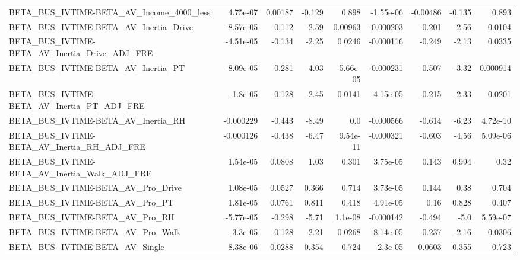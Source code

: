 \begin{tabular}{lrrrrrrrr}
BETA\_BUS\_IVTIME-BETA\_AV\_Income\_4000\_less           &    4.75e-07 &      0.00187 &   -0.129 &    0.898 &  -1.55e-06 &    -0.00486 &       -0.135 &         0.893 \\
BETA\_BUS\_IVTIME-BETA\_AV\_Inertia\_Drive              &   -8.57e-05 &       -0.112 &    -2.59 &  0.00963 &  -0.000203 &      -0.201 &        -2.56 &        0.0104 \\
BETA\_BUS\_IVTIME-BETA\_AV\_Inertia\_Drive\_ADJ\_FRE      &   -4.51e-05 &       -0.134 &    -2.25 &   0.0246 &  -0.000116 &      -0.249 &        -2.13 &        0.0335 \\
BETA\_BUS\_IVTIME-BETA\_AV\_Inertia\_PT                 &   -8.09e-05 &       -0.281 &    -4.03 & 5.66e-05 &  -0.000231 &      -0.507 &        -3.32 &      0.000914 \\
BETA\_BUS\_IVTIME-BETA\_AV\_Inertia\_PT\_ADJ\_FRE         &    -1.8e-05 &       -0.128 &    -2.45 &   0.0141 &  -4.15e-05 &      -0.215 &        -2.33 &        0.0201 \\
BETA\_BUS\_IVTIME-BETA\_AV\_Inertia\_RH                 &   -0.000229 &       -0.443 &    -8.49 &      0.0 &  -0.000566 &      -0.614 &        -6.23 &      4.72e-10 \\
BETA\_BUS\_IVTIME-BETA\_AV\_Inertia\_RH\_ADJ\_FRE         &   -0.000126 &       -0.438 &    -6.47 & 9.54e-11 &  -0.000321 &      -0.603 &        -4.56 &      5.09e-06 \\
BETA\_BUS\_IVTIME-BETA\_AV\_Inertia\_Walk\_ADJ\_FRE       &    1.54e-05 &       0.0808 &     1.03 &    0.301 &   3.75e-05 &       0.143 &        0.994 &          0.32 \\
BETA\_BUS\_IVTIME-BETA\_AV\_Pro\_Drive                  &    1.08e-05 &       0.0527 &    0.366 &    0.714 &   3.73e-05 &       0.144 &         0.38 &         0.704 \\
BETA\_BUS\_IVTIME-BETA\_AV\_Pro\_PT                     &    1.81e-05 &       0.0761 &    0.811 &    0.418 &   4.91e-05 &        0.16 &        0.828 &         0.407 \\
BETA\_BUS\_IVTIME-BETA\_AV\_Pro\_RH                     &   -5.77e-05 &       -0.298 &    -5.71 &  1.1e-08 &  -0.000142 &      -0.494 &         -5.0 &      5.59e-07 \\
BETA\_BUS\_IVTIME-BETA\_AV\_Pro\_Walk                   &    -3.3e-05 &       -0.128 &    -2.21 &   0.0268 &  -8.14e-05 &      -0.237 &        -2.16 &        0.0306 \\
BETA\_BUS\_IVTIME-BETA\_AV\_Single                     &    8.38e-06 &       0.0288 &    0.354 &    0.724 &    2.3e-05 &      0.0603 &        0.355 &         0.723 \\

\end{tabular}
